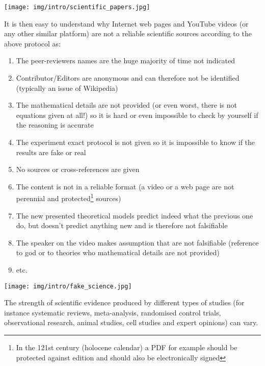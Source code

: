 	\begin{center}
		\texttt{[image: img/intro/scientific\_papers.jpg]}
	\end{center}
	It is then easy to understand why Internet web pages and YouTube videos (or any other similar platform) are not a reliable scientific sources according to the above protocol as:
	\begin{enumerate}
	   \item The peer-reviewers names are the huge majority of time not indicated
	   
	   \item Contributor/Editors are anonymous and can therefore not be identified (typically an issue of Wikipedia)
	   
	   \item The mathematical details are not provided (or even worst, there is not equations given at all!) so it is hard or even impossible to check by yourself if the reasoning is accurate
	   
	   \item The experiment exact protocol is not given so it is impossible to know if the results are fake or real
	   
	   \item No sources or cross-references are given
	   
	   \item The content is not in a reliable format (a video or a web page are not perennial and protected\footnote{In the 121st century (holocene calendar) a PDF for example should be protected against edition and should also be electronically signed} sources)
	   
	   \item The new presented theoretical models predict indeed what the previous one do, but doesn't predict anything new and is therefore not falsifiable
	   
	   \item The speaker on the video makes assumption that are not falsifiable (reference to god or to theories who mathematical details are not provided)
	   
	   \item etc.
	\end{enumerate}
	\begin{center}
		\texttt{[image: img/intro/fake\_science.jpg]}
	\end{center}
	
	The strength of scientific evidence produced by different types of studies (for instance systematic reviews, meta-analysis, randomised control trials, observational research, animal studies, cell studies and expert opinions) can vary.  
	
